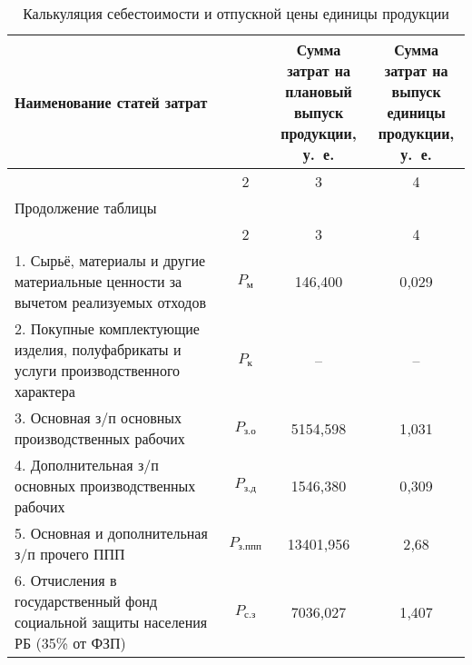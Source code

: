 {\small
\begin{longtable}{| m{10.7cm} | c | c | c |}
  \caption{
    Калькуляция себестоимости и отпускной цены единицы продукции
  }\label{tbl:calculation} \\
      \hline
      \centering Наименование статей затрат
      & \rotatebox[origin=c]{90}{\parbox{3.5cm}{Условное обозначение}}
      & \rotatebox[origin=c]{90}{
        \parbox{3.5cm}{
          Сумма затрат на \\ плановый выпуск \\ продукции, у.~е.
        }
      }
      & \rotatebox[origin=c]{90}{
        \parbox{3.5cm}{
          Сумма затрат на \\ выпуск единицы \\ продукции, у.~е.
        }
      } \\

      \hline
      \centering 1 & 2 & 3 & 4 \\
      \hline
      \endfirsthead 

      \multicolumn{4}{l}{\normalsize Продолжение таблицы \thetable{}} \\
      \hline
      \centering 1 & 2 & 3 & 4 \\
      \hline
      \endhead

      1. Сырьё, материалы и другие материальные ценности \newline
      за вычетом реализуемых отходов
      & \( P_{\text{м}} \) & 146{,}400 & 0{,}029 \\
      \hline

      2. Покупные комплектующие изделия, полуфабрикаты и \newline
      услуги производственного характера
      & \( P_{\text{к}} \) & -- & -- \\
      \hline

      3. Основная з/п основных производственных рабочих
      & \( P_{\text{з.о}} \) & 5154{,}598 & 1{,}031 \\
      \hline

      4. Дополнительная з/п основных производственных рабочих
      & \( P_{\text{з.д}} \) & 1546{,}380 & 0{,}309 \\
      \hline

      5. Основная и дополнительная з/п прочего ППП
      & \( P_{\text{з.ппп}} \) & 13401{,}956 & 2{,}68 \\
      \hline

      6. Отчисления в государственный фонд социальной \newline
      защиты населения РБ (35\% от ФЗП)
      & \( P_{\text{с.з}} \) & 7036{,}027 & 1{,}407 \\
      \hline


\end{longtable}}
